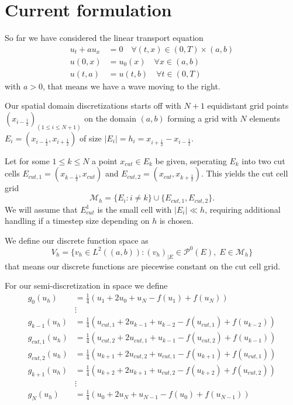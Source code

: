 \documentclass[]{article}
\title{}
\author{}
\begin{document}
\maketitle

\section{Current formulation}

So far we have considered the linear transport equation
\begin{align*}
u_t + a u_x & = 0 \quad \forall (t, x) \in (0, T) \times (a, b) \\
u(0, x)  & = u_0(x) \quad \forall x \in (a, b)\\
u(t, a) & = u(t, b) \quad \forall t \in (0, T)
\end{align*}
with $a > 0$, that means we have a wave moving to the right.

Our spatial domain discretizations starts off with $N+1$ equidistant grid points $(x_{i - \frac{1}{2}})_{(1 \le i \le N + 1)}$ on the domain $(a, b)$ forming a grid with $N$ elements  $E_i = (x_{i - \frac{1}{2}}, x_{i + \frac{1}{2}})$ of size $|E_i| = h_i = x_{i + \frac{i}{2}} - x_{i - \frac{1}{2}}$.

Let for some $1 \le k \le N$ a point $x_{cut} \in E_k$  be given, seperating $E_k$ into two cut cells $E_{cut, 1} = (x_{k - \frac{1}{2}}, x_{cut})$ and $E_{cut, 2} = (x_{cut}, x_{k + \frac{1}{2}})$.  This yields the cut cell grid
\[
\mathcal{M}_h = \{ E_i : i \neq k\} \cup \{ E_{cut, 1}, E_{cut, 2} \}.
\]
We will assume that $E_{cut}^1$ is the small cell with $|E_i| \ll h$, requiring additional handling if a timestep size depending on $h$ is chosen.

We define our discrete function space as
\[
V_h = \{ v_h \in L^2((a, b)) : (v_h)_{|E} \in \mathcal{P}^0(E), \; E \in \mathcal{M}_h \}
\]
that means our discrete functions are piecewise constant on the cut cell grid.

For our semi-discretization in space we define
\begin{align*}
g_0(u_h) & = \frac{1}{4} ( u_1 + 2 u_0 + u_N -f(u_1) + f(u_N)) \\
& \vdots \\
g_{k-1} (u_h) & = \frac{1}{4} ( u_{cut, 1} + 2 u_{k-1} + u_{k-2} -f(u_{cut, 1} ) + f(u_{k-2} )) \\
g_{cut, 1} (u_h) & = \frac{1}{4} ( u_{cut, 2}  + 2 u_{cut, 1}  + u_{k-1} -f(u_{cut, 2}) + f(u_{k-1})) \\
g_{cut, 2}(u_h)  & = \frac{1}{4} ( u_{k+1} + 2 u_{cut, 2}  + u_{cut, 1}  -f(u_{k+1}) + f(u_{cut, 1})) \\
g_{k+1}(u_h)  & = \frac{1}{4} ( u_{k+2} + 2 u_{k+1} + u_{cut, 2} -f(u_{k+2}) + f(u_{cut, 2})) \\
& \vdots\\
g_N(u_h)  & = \frac{1}{4} ( u_0 + 2 u_N + u_{N-1} -f(u_0) + f(u_{N-1}))
\end{align*}
\end{document}
